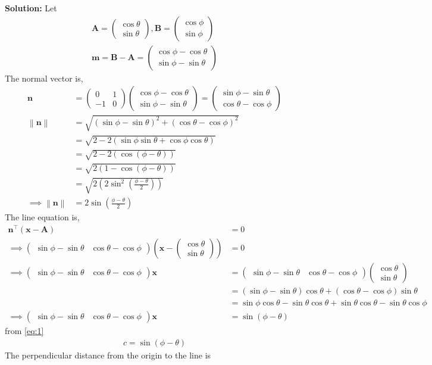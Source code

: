 \documentclass[10pt]{article}
\providecommand{\brak}[1]{\ensuremath{\left(#1\right)}}
\providecommand{\norm}[1]{\left\lVert#1\right\rVert}
\newcommand{\solution}{\noindent \textbf{Solution: }}
\newcommand{\myvec}[1]{\ensuremath{\begin{pmatrix}#1\end{pmatrix}}}
\let\vec\mathbf
\begin{document}
\begin{enumerate}
\solution
Let
\begin{align}
\vec{A}=\myvec{\cos\theta\\\sin\theta},\vec{B}=\myvec{\cos\phi\\\sin\phi}\\
\vec{m}=\vec{B}-\vec{A}=\myvec{\cos\phi-\cos\theta\\\sin\phi-\sin\theta}
\end{align}
The normal vector is,
\begin{align}
\vec{n}&=\myvec{0&1\\-1&0}\myvec{\cos\phi-\cos\theta\\\sin\phi-\sin\theta}=\myvec{\sin\phi-\sin\theta\\\cos\theta-\cos\phi}\\
\norm{\vec{n}}&=\sqrt{\brak{\sin\phi-\sin\theta}^2+\brak{\cos\theta-\cos\phi}^2}\\
&=\sqrt{2-2\brak{\sin\phi\sin\theta+\cos\phi\cos\theta}}\\
&=\sqrt{2-2\brak{\cos\brak{\phi-\theta}}}\\
&=\sqrt{2\brak{1-\cos\brak{\phi-\theta}}}\\
&=\sqrt{2\brak{2\sin^2\brak{\frac{\phi-\theta}{2}}}}\\
\implies\norm{\vec{n}}&=2\sin\brak{\frac{\phi-\theta}{2}}
\end{align}
The line equation is,
\begin{align}
\vec{n}^\top\brak{\vec{x}-\vec{A}}&=0\\
\implies\myvec{\sin\phi-\sin\theta&\cos\theta-\cos\phi}\brak{\vec{x}-\myvec{\cos\theta\\\sin\theta}}&=0\\
\implies\myvec{\sin\phi-\sin\theta&\cos\theta-\cos\phi}\vec{x}&=\myvec{\sin\phi-\sin\theta&\cos\theta-\cos\phi}\myvec{\cos\theta\\\sin\theta}\\
&=\brak{\sin\phi-\sin\theta}\cos\theta+\brak{\cos\theta-\cos\phi}\sin\theta\\
&=\sin\phi\cos\theta-\sin\theta\cos\theta+\sin\theta\cos\theta-\sin\theta\cos\phi\\
\implies\myvec{\sin\phi-\sin\theta&\cos\theta-\cos\phi}\vec{x}&=\sin\brak{\phi-\theta}
\label{eq:1}
\end{align}
from \eqref{eq:1}
\begin{align}
c=\sin\brak{\phi-\theta}
\end{align}
The perpendicular distance from the origin to the line is
\begin{align}

\end{align}
\end{enumerate}
\end{document}
